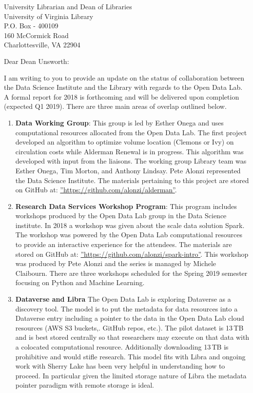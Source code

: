 \documentclass{letter}
\begin{document}
\begin{letter}{University Librarian and Dean of Libraries \\ University of Virginia Library \\ P.O. Box - 400109 \\ 160 McCormick Road \\ Charlottesville, VA 22904}

\opening{Dear Dean Unsworth:}

I am writing to you to provide an update on the status of collaboration between the Data Science Institute and the Library with regards to the Open Data Lab. A formal report for 2018 is forthcoming and will be delivered upon completion (expected Q1 2019). There are three main areas of overlap outlined below.

\begin{enumerate}
\item \textbf{Data Working Group}: This group is led by Esther Onega and uses computational resources allocated from the Open Data Lab. The first project developed an algorithm to optimize volume location (Clemons or Ivy) on circulation costs while Alderman Renewal is in progress. This algorithm was developed with input from the liaisons. The working group Library team was Esther Onega, Tim Morton, and Anthony Lindsay. Pete Alonzi represented the Data Science Institute. The materials pertaining to this project are stored on GitHub at: \hyperref[https://github.com/alonzi/alderman]{''https://github.com/alonzi/alderman''}.

\item \textbf{Research Data Services Workshop Program}: This program includes workshops produced by the Open Data Lab group in the Data Science institute. In 2018 a workshop was given about the scale data solution Spark. The workshop was powered by the Open Data Lab computational resources to provide an interactive experience for the attendees. The materials are stored on GitHub at:  \hyperref[https://github.com/alonzi/spark-intro]{''https://github.com/alonzi/spark-intro''}. This workshop was produced by Pete Alonzi and the series is managed by Michele Claibourn. There are three workshops scheduled for the Spring 2019 semester focusing on Python and Machine Learning.

\item \textbf{Dataverse and Libra}
The Open Data Lab is exploring Dataverse as a discovery tool. The model is to put the metadata for data resources into a Dataverse entry including a pointer to the data in the Open Data Lab cloud resources (AWS S3 buckets,. GitHub repos, etc.). The pilot dataset is 13\,TB and is best stored centrally so that researchers may execute on that data with a colocated computational resource. Additionally downloading 13\,TB is prohibitive and would stifle research. This model fits with Libra and ongoing work with Sherry Lake has been very helpful in understanding how to proceed. In particular given the limited storage nature of Libra the metadata pointer paradigm with remote storage is ideal.
\end{enumerate}


\end{letter}
\end{document}
